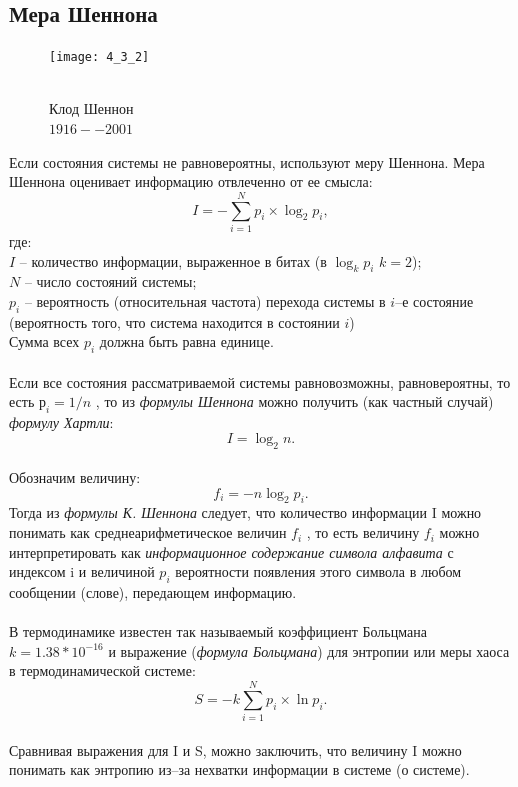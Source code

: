 \subsection{Мера Шеннона }
\begin{figure}
\texttt{[image: 4\_3\_2]}
\begin{center}
\caption{
\\\footnotesize{Клод Шеннон}
\\\footnotesize{$1916 -- 2001$}\\}
\end{center}
\end{figure}

Если состояния системы не равновероятны, используют меру Шеннона. Мера Шеннона оценивает информацию отвлеченно от ее смысла:
$$I = - \sum^{N}_{i=1}p_{i}\times \log_{2}p_{i},$$ где:
\\$I$ -- количество информации, выраженное в битах (в $\log_{k}p_{i}$ $k = 2$);
\\$N$ -- число состояний системы;
\\$p_{i}$ -- вероятность (относительная частота) перехода системы в $i$--е состояние (вероятность того, что система находится в состоянии $i$) \\Сумма всех $p_{i}$ должна быть равна единице.\\
\\Если все состояния рассматриваемой системы равновозможны, равновероятны, то есть $р_i = 1/n$ , то из \emph{формулы Шеннона} можно получить (как частный случай) \emph{формулу Хартли}:
$$I = \log_{2}n.$$
\\Обозначим величину:
$$f_i = -n\log_{2}p_i.$$
\newpage
Тогда из \emph{формулы К. Шеннона} следует, что количество информации I можно понимать как среднеарифметическое величин $f_i$ , то есть величину $f_i$ можно интерпретировать как \emph{информационное содержание символа алфавита} с индексом i и величиной $p_i$ вероятности появления этого символа в любом сообщении (слове), передающем информацию.\\
\\ В термодинамике известен так называемый коэффициент Больцмана $k = 1.38 * 10^{-16}$ и выражение (\emph{формула Больцмана}) для энтропии или меры хаоса в термодинамической системе:
$$ S = -k \sum^{N}_{i=1}p_{i}\times \ln{p_{i}}.$$
\\ Сравнивая выражения для I и S, можно заключить, что величину I можно понимать как энтропию из--за нехватки информации в системе (о системе).\\

